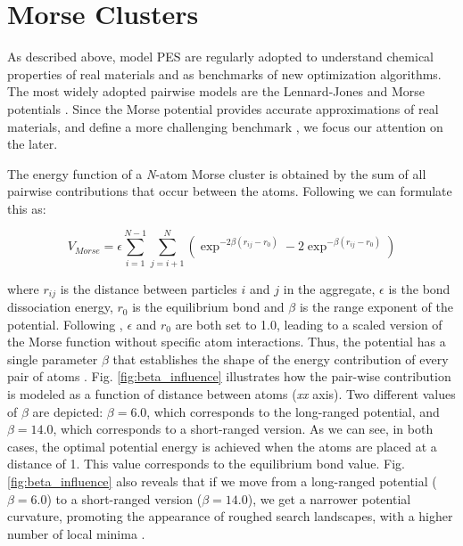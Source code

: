 	\section{Morse Clusters}
	
	As described above, model PES are regularly adopted to understand chemical properties of real materials and as benchmarks of new optimization algorithms. The most widely adopted pairwise models are the Lennard-Jones \cite{lennardJones31} and Morse potentials \cite{morse29}. Since the Morse potential provides accurate approximations of real materials, and define a more challenging benchmark \cite{braier90, smirnov99}, we focus our attention on the later.

	The energy function of a \emph{N}-atom Morse cluster is obtained by the sum of all pairwise contributions that occur between the atoms. Following \cite{doye97, morse29} we can formulate this as:
	
	\begin{equation} 
		\label{eq:morse_potential}
		V_{Morse} = \epsilon \sum_{i=1}^{N-1}\sum_{j=i+1}^{N} \left ( \exp^{-2\beta(r_{ij}-r_{0})} - 2\exp^{-\beta(r_{ij}-r_{0})} \right)
	\end{equation}


	\noindent where $r_{ij}$ is the distance between particles $i$ and $j$ in the aggregate, $\epsilon$ is the bond dissociation energy, $r_{0}$ is the equilibrium bond and $\beta$ is the range exponent of the potential. Following \cite{doye97}, $\epsilon$ and $r_{0}$ are both set to 1.0, leading to a scaled version of the Morse function without specific atom interactions. Thus, the potential has a single parameter $\beta$ that establishes the shape of the energy contribution of every pair of atoms \cite{doye04}. Fig. \ref{fig:beta_influence} illustrates how the pair-wise contribution is modeled as a function of distance between atoms (\emph{xx} axis). Two different values of $\beta$ are depicted: $\beta = 6.0$, which corresponds to the long-ranged potential, and $\beta = 14.0$, which corresponds to a short-ranged version. As we can see, in both cases, the optimal potential energy is achieved when the atoms are placed at a distance of 1. This value corresponds to the equilibrium bond value. Fig.\ref{fig:beta_influence} also reveals that if we move from a long-ranged potential ($\beta = 6.0$) to a short-ranged version ($\beta = 14.0$), we get a narrower potential curvature, promoting the appearance of roughed search landscapes, with a higher number of local minima \cite{doye04}.
	
	
	
	
	
	
	
	
	
